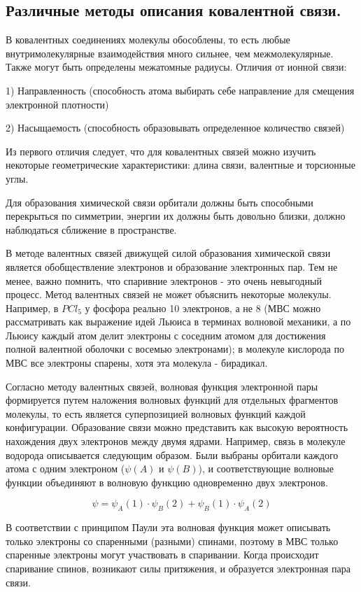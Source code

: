 
\subsection{Различные методы описания ковалентной связи.}

В ковалентных соединениях молекулы обособлены, то есть любые
внутримолекулярные взаимодействия много сильнее, чем
межмолекулярные. Также могут быть определены межатомные
радиусы. Отличия от ионной связи:
 
1) Направленность  (способность атома выбирать себе направление
для смещения электронной плотности)

2) Насыщаемость (способность образовывать определенное
количество связей)

Из первого отличия следует, что для ковалентных связей можно
изучить некоторые геометрические характеристики: длина связи,
валентные и торсионные углы.

Для образования химической связи орбитали должны быть
способными перекрыться по симметрии, энергии их должны быть
довольно близки, должно наблюдаться сближение в пространстве.

В методе валентных связей движущей силой образования химической
связи является обобществление электронов и образование
электронных пар. Тем не менее, важно помнить, что спаривние
электронов - это очень невыгодный процесс. Метод валентных связей
не может объяснить некоторые молекулы. Например, в $PCl_5$ у
фосфора реально 10 электронов, а не 8 (МВС можно рассматривать как
выражение идей Льюиса в терминах волновой механики, а по
Льюису каждый атом делит электроны с соседним атомом для
достижения полной валентной оболочки с восемью электронами); в
молекуле кислорода по МВС все электроны спарены, хотя эта
молекула - бирадикал.

 Согласно методу валентных связей, волновая
функция электронной пары формируется путем наложения волновых
функций для отдельных фрагментов молекулы, то есть является
суперпозицией волновых функций каждой конфигурации.
Образование связи можно представить как высокую вероятность
нахождения двух электронов между двумя ядрами. Например, связь в
молекуле водорода описывается следующим образом. Были выбраны
орбитали каждого атома с одним электроном ($\psi(A)$ и $\psi(B)$), и
соответствующие волновые функции объединяют в волновую
функцию одновременно двух электронов.

$$\psi = \psi_A(1)\cdot\psi_B(2) + \psi_B(1)\cdot\psi_A(2)$$
 
 В соответствии с принципом Паули эта волновая функция может
описывать только электроны со спаренными (разными) спинами,
поэтому в МВС только спаренные электроны могут участвовать в
спаривании. Когда происходит спаривание спинов, возникают силы
притяжения, и образуется электронная пара связи.

